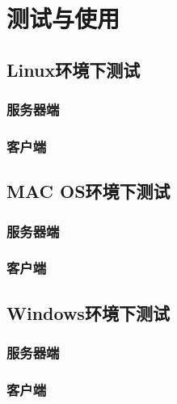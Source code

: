 \chapter{测试与使用}
\section{Linux环境下测试}
\subsection{服务器端}
\subsection{客户端}
\section{MAC OS环境下测试}
\subsection{服务器端}
\subsection{客户端}
\section{Windows环境下测试}
\subsection{服务器端}
\subsection{客户端}

